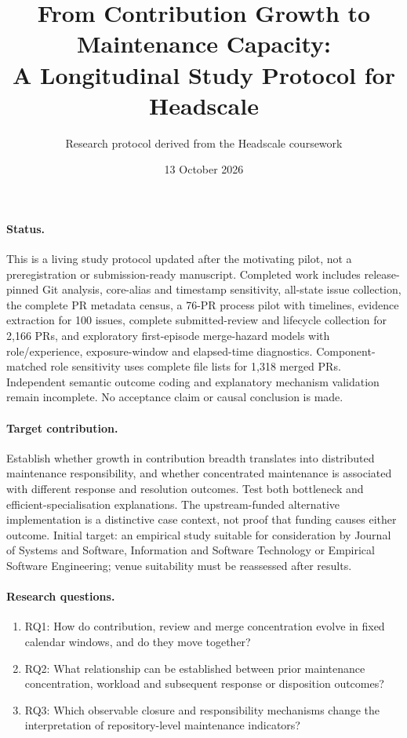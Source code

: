 \documentclass[11pt]{article}
\title{From Contribution Growth to Maintenance Capacity:\\A Longitudinal Study Protocol for Headscale}
\author{Research protocol derived from the Headscale coursework}
\date{13 October 2026}
\begin{document}
\maketitle
\paragraph{Status.} This is a living study protocol updated after the motivating
pilot, not a preregistration or submission-ready manuscript. Completed work includes
release-pinned Git analysis, core-alias and timestamp sensitivity, all-state issue
collection, the complete PR metadata census, a 76-PR process pilot with timelines,
evidence extraction for 100 issues, complete submitted-review and lifecycle
collection for 2,166 PRs, and exploratory first-episode merge-hazard models with
role/experience, exposure-window and elapsed-time diagnostics. Component-matched
role sensitivity uses complete file lists for 1,318 merged PRs. Independent semantic
outcome coding and explanatory mechanism validation remain incomplete. No acceptance
claim or causal conclusion is made.

\paragraph{Target contribution.} Establish whether growth in contribution breadth
translates into distributed maintenance responsibility, and whether concentrated
maintenance is associated with different response and resolution outcomes. Test
both bottleneck and efficient-specialisation explanations. The upstream-funded
alternative implementation is a distinctive case context, not proof that funding
causes either outcome. Initial target: an empirical study suitable for consideration
by Journal of Systems and Software, Information and Software Technology or
Empirical Software Engineering; venue suitability must be reassessed after results.

\paragraph{Research questions.}
\begin{enumerate}
\item RQ1: How do contribution, review and merge concentration evolve in fixed
calendar windows, and do they move together?
\item RQ2: What relationship can be established between prior maintenance
concentration, workload and subsequent response or disposition outcomes?
\item RQ3: Which observable closure and responsibility mechanisms change the
interpretation of repository-level maintenance indicators?
\end{enumerate}
\end{document}
